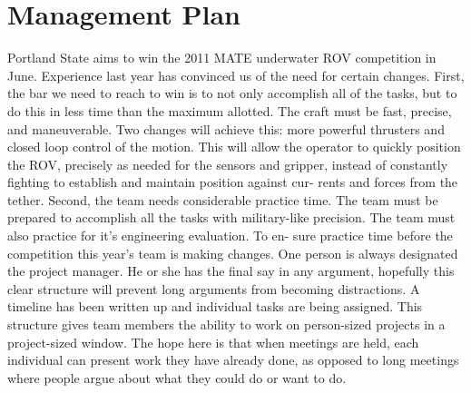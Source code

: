 \documentclass{proposalnsf}
\begin{document}
\section{Management Plan}

Portland State aims to win the 2011 MATE underwater ROV competition in
June. Experience last year has convinced us of the need for certain changes.
First, the bar we need to reach to win is to not only accomplish all of the
tasks, but to do this in less time than the maximum allotted. The craft must be
fast, precise, and maneuverable. Two changes will achieve this: more powerful
thrusters and closed loop control of the motion. This will allow the operator
to quickly position the ROV, precisely as needed for the sensors and gripper,
instead of constantly fighting to establish and maintain position against cur-
rents and forces from the tether. Second, the team needs considerable practice
time. The team must be prepared to accomplish all the tasks with military-like
precision. The team must also practice for it's engineering evaluation. To en-
sure practice time before the competition this year's team is making changes.
One person is always designated the project manager. He or she has the final
say in any argument, hopefully this clear structure will prevent long arguments
from becoming distractions. A timeline has been written up and individual tasks
are being assigned. This structure gives team members the ability to work on
person-sized projects in a project-sized window. The hope here is that when
meetings are held, each individual can present work they have already done, as
opposed to long meetings where people argue about what they could do or want
to do.
\end{document}

